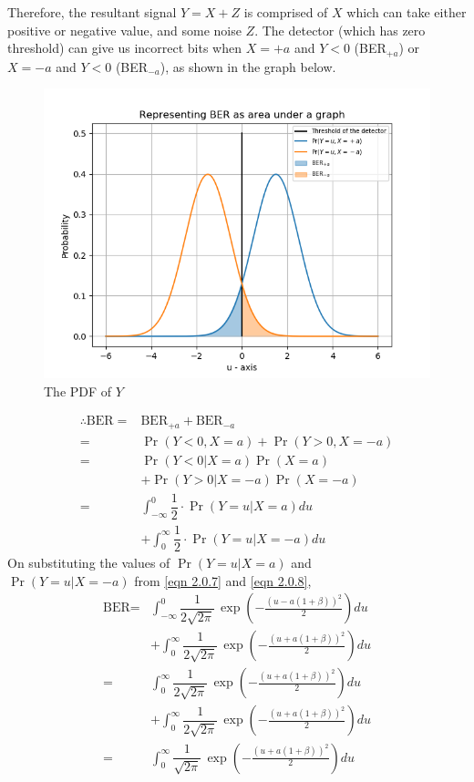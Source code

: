 \documentclass[journal,10pt,twocolumn]{IEEEtran}
\begin{document}
Therefore, the resultant signal $Y = X+Z$ is comprised of $X$ which can take either positive or negative value, and some noise $Z$. The detector (which has zero threshold) can give us incorrect bits when $X = +a$ and $Y<0$ (BER$_{+a}$) or $X=-a$ and $Y<0$ (BER$_{-a}$), as shown in the graph below.
~\\[-2em]
\begin{figure}[!htb]
    \centering    
	\includegraphics[width=\columnwidth]{./Figures/Figure_1.png}
    \caption{The PDF of $Y$}
\end{figure}
\begin{align}
\therefore \text{BER} = {}& \text{BER}_{+a} + \text{BER}_{-a}\\
= {}& \Pr(Y < 0, X = a) + \Pr(Y>0, X = -a)\\
 = {}& \Pr(Y<0 | X = a) \Pr(X=a) \nonumber \\ &+ \Pr(Y>0 | X = -a) \Pr(X=-a)\\
 = {}& \int_{- \infty} ^ 0 \dfrac{1}{2} \cdot \Pr(Y = u | X = a) du \nonumber \\
 &+ \int_{0} ^{ \infty} \dfrac{1}{2} \cdot \Pr(Y = u | X = -a) du
\end{align}
On substituting the values of $\Pr(Y=u|X=a)$ and\\
$\Pr(Y=u|X=-a)$ from \ref{eqn 2.0.7} and \ref{eqn 2.0.8}, 
\begin{align}
\text{BER} = {}& \int_{- \infty } ^ 0 \dfrac{1}{2\sqrt{2\pi}}\,\exp \left(-\frac{(u - a(1 + \beta))^2}{2} \right) du \nonumber \\
&+ \int_{0} ^ {\infty } \dfrac{1}{2\sqrt{2\pi}}\,\exp \left(-\frac{(u + a(1 + \beta))^2}{2} \right) du\\
 = {}& \int_{0} ^ {\infty } \dfrac{1}{2\sqrt{2\pi}}\,\exp \left(-\frac{(u + a(1 + \beta))^2}{2} \right) du \nonumber \\
 &+ \int_{0} ^ {\infty } \dfrac{1}{2\sqrt{2\pi}}\,\exp \left(-\frac{(u + a(1 + \beta))^2}{2} \right) du\\
 = {}& \int_{0} ^ {\infty } \dfrac{1}{\sqrt{2\pi}}\,\exp \left(-\frac{(u + a(1 + \beta))^2}{2} \right) du \label{eqn 2.0.17}
\end{align} 
\end{document}
